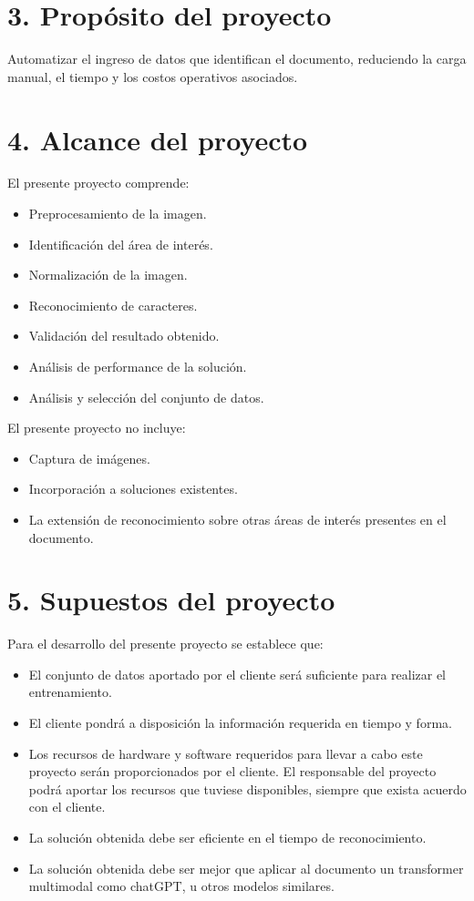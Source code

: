 \documentclass[
11pt, %
]{charter}
\begin{document}
\newpage
\section{3. Propósito del proyecto}
\label{sec:proposito}

Automatizar el ingreso de datos que identifican el documento, reduciendo la carga manual, el tiempo y los costos operativos asociados.


\section{4. Alcance del proyecto}
\label{sec:alcance}

El presente proyecto comprende:
\begin{itemize}
	\item Preprocesamiento de la imagen.
	\item Identificación del área de interés.
	\item Normalización de la imagen.
	\item Reconocimiento de caracteres.
	\item Validación del resultado obtenido.
	\item Análisis de performance de la solución.
	\item Análisis y selección del conjunto de datos.
\end{itemize}

El presente proyecto no incluye:
\begin{itemize}
	\item Captura de imágenes.
	\item Incorporación a soluciones existentes.
	\item La extensión de reconocimiento sobre otras áreas de interés presentes en el documento.
\end{itemize}

\section{5. Supuestos del proyecto}
\label{sec:supuestos}

Para el desarrollo del presente proyecto se establece que:
\begin{itemize}
	\item El conjunto de datos aportado por el cliente será suficiente para realizar el entrenamiento.
	\item El cliente pondrá a disposición la información requerida en tiempo y forma.
	\item Los recursos de hardware y software requeridos para llevar a cabo este proyecto serán proporcionados por el cliente. El responsable del proyecto podrá aportar los recursos que tuviese disponibles, siempre que exista acuerdo con el cliente.
	\item La solución obtenida debe ser eficiente en el tiempo de reconocimiento.
	\item La solución obtenida debe ser mejor que aplicar al documento un transformer multimodal como chatGPT, u otros modelos similares.
\end{itemize}
\end{document}
